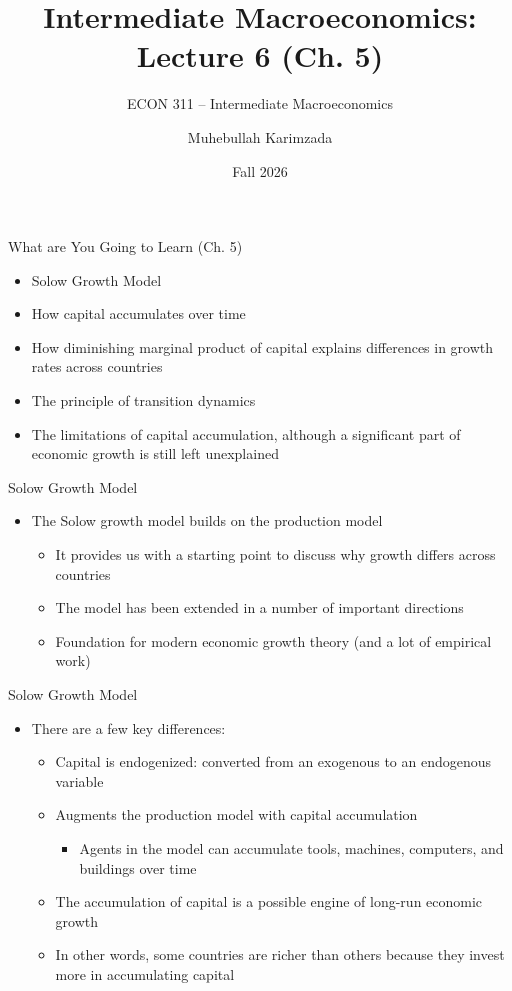 \documentclass[aspectratio=1610]{beamer}
\title[Fall - Lecture 6] %
{Intermediate Macroeconomics: Lecture  6 (Ch. 5)}
\subtitle{ECON 311 -- Intermediate Macroeconomics}
\author{Muhebullah Karimzada}
\institute{School of Economics \\\ University of Northern British Columbia}
\date{Fall 2026}
\begin{document}
\begin{frame}[plain]
  \titlepage
\end{frame}

\begin{frame}[wide]{What are You Going to Learn (Ch. 5)}
	\begin{itemize}
		\item Solow Growth Model
		\item How capital accumulates over time
		\item How diminishing marginal product of capital explains differences in growth rates across countries
		\item The principle of transition dynamics
		\item The limitations of capital accumulation, although a significant part of economic growth is still left unexplained
	\end{itemize}
\end{frame}

\begin{frame}[wide]{Solow Growth Model}
	\begin{itemize}
		\item The Solow growth model builds on the production model
		\begin{itemize}
			\item It provides us with a starting point to discuss why growth differs across countries
			\item The model has been extended in a number of important directions
			\item Foundation for modern economic growth theory (and a lot of empirical work)
		\end{itemize}		
	\end{itemize}
\end{frame}

\begin{frame}[wide]{Solow Growth Model}
	\begin{itemize}
		\item There are a few key differences:
		\begin{itemize}
			\item Capital is endogenized: converted from an exogenous to an endogenous variable
			\item Augments the production model with capital accumulation
			\begin{itemize}
				\item Agents in the model can accumulate tools, machines, computers, and buildings over time
			\end{itemize}
			\item The accumulation of capital is a possible engine of long-run economic growth
			\item In other words, some countries are richer than others because they invest more in accumulating capital
		\end{itemize}
		
	\end{itemize}
\end{frame}
\end{document}
